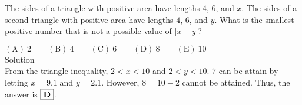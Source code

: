 
The sides of a triangle with positive area have lengths $4$, $6$, and $x$. The sides of a second triangle with positive area have lengths $4$, $6$, and $y$. What is the smallest positive number that is not a possible value of $|x-y|$?

$\mathrm{(A)}\ 2 \qquad\mathrm{(B)}\ 4 \qquad\mathrm{(C)}\ 6 \qquad\mathrm{(D)}\ 8 \qquad\mathrm{(E)}\ 10$
\\
Solution
\\
From the triangle inequality, $2<x<10$ and $2<y<10$. $7$ can be attain by letting $x=9.1$ and $y=2.1$. However, $8=10-2$ cannot be attained. Thus, the answer is $\boxed{\bold{D}}$.
